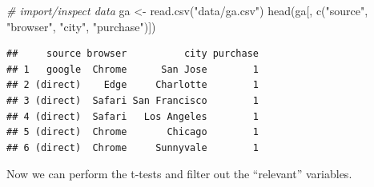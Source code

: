 \documentclass[
  12pt,
]{style/krantz}
\newenvironment{Shaded}{\begin{snugshade}}{\end{snugshade}}
\newcommand{\AttributeTok}[1]{\textcolor[rgb]{0.77,0.63,0.00}{#1}}
\newcommand{\CommentTok}[1]{\textcolor[rgb]{0.56,0.35,0.01}{\textit{#1}}}
\newcommand{\DecValTok}[1]{\textcolor[rgb]{0.00,0.00,0.81}{#1}}
\newcommand{\FunctionTok}[1]{\textcolor[rgb]{0.00,0.00,0.00}{#1}}
\newcommand{\NormalTok}[1]{#1}
\newcommand{\OtherTok}[1]{\textcolor[rgb]{0.56,0.35,0.01}{#1}}
\newcommand{\SpecialCharTok}[1]{\textcolor[rgb]{0.00,0.00,0.00}{#1}}
\newcommand{\StringTok}[1]{\textcolor[rgb]{0.31,0.60,0.02}{#1}}
\begin{document}
\begin{Shaded}
\begin{Highlighting}[]
\CommentTok{\# import/inspect data}
\NormalTok{ga }\OtherTok{\textless{}{-}} \FunctionTok{read.csv}\NormalTok{(}\StringTok{"data/ga.csv"}\NormalTok{)}
\FunctionTok{head}\NormalTok{(ga[, }\FunctionTok{c}\NormalTok{(}\StringTok{"source"}\NormalTok{, }\StringTok{"browser"}\NormalTok{, }\StringTok{"city"}\NormalTok{, }\StringTok{"purchase"}\NormalTok{)])}
\end{Highlighting}
\end{Shaded}

\begin{verbatim}
##     source browser          city purchase
## 1   google  Chrome      San Jose        1
## 2 (direct)    Edge     Charlotte        1
## 3 (direct)  Safari San Francisco        1
## 4 (direct)  Safari   Los Angeles        1
## 5 (direct)  Chrome       Chicago        1
## 6 (direct)  Chrome     Sunnyvale        1
\end{verbatim}

\begin{Shaded}
\end{Shaded}

Now we can perform the t-tests and filter out the ``relevant'' variables.
\end{document}
